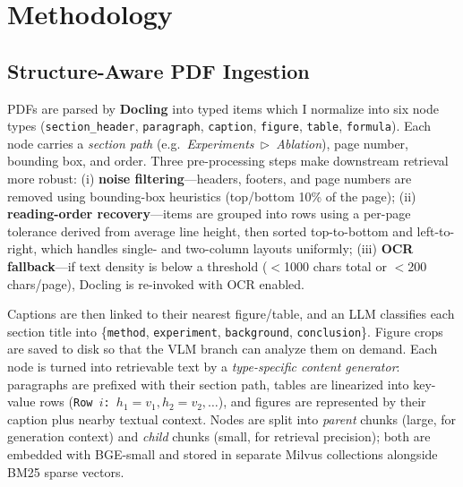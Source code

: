 \documentclass[11pt]{article}
\begin{document}
\section{Methodology}
\label{sec:methods}
\vspace{-0.2em}

\subsection{Structure-Aware PDF Ingestion}
PDFs are parsed by \textbf{Docling} into typed items which I normalize into six node types (\texttt{section\_header}, \texttt{paragraph}, \texttt{caption}, \texttt{figure}, \texttt{table}, \texttt{formula}). Each node carries a \emph{section path} (e.g.\ \textit{Experiments~$\triangleright$~Ablation}), page number, bounding box, and order. Three pre-processing steps make downstream retrieval more robust: (i) \textbf{noise filtering}---headers, footers, and page numbers are removed using bounding-box heuristics (top/bottom 10\% of the page); (ii) \textbf{reading-order recovery}---items are grouped into rows using a per-page tolerance derived from average line height, then sorted top-to-bottom and left-to-right, which handles single- and two-column layouts uniformly; (iii) \textbf{OCR fallback}---if text density is below a threshold ($<$1000 chars total or $<$200 chars/page), Docling is re-invoked with OCR enabled.

Captions are then linked to their nearest figure/table, and an LLM classifies each section title into \{\texttt{method}, \texttt{experiment}, \texttt{background}, \texttt{conclusion}\}. Figure crops are saved to disk so that the VLM branch can analyze them on demand. Each node is turned into retrievable text by a \emph{type-specific content generator}: paragraphs are prefixed with their section path, tables are linearized into key-value rows (\texttt{Row $i$: $h_1{=}v_1, h_2{=}v_2, \dots$}), and figures are represented by their caption plus nearby textual context. Nodes are split into \emph{parent} chunks (large, for generation context) and \emph{child} chunks (small, for retrieval precision); both are embedded with BGE-small and stored in separate Milvus collections alongside BM25 sparse vectors.
\end{document}
